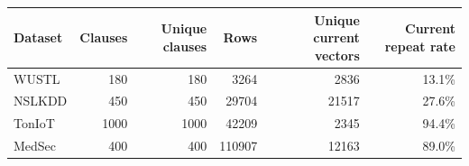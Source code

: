 \begin{tabular}{lrrrrr}
\toprule
Dataset & Clauses & Unique clauses & Rows & Unique current vectors & Current repeat rate \\
\midrule
WUSTL & 180 & 180 & 3264 & 2836 & 13.1\% \\
NSLKDD & 450 & 450 & 29704 & 21517 & 27.6\% \\
TonIoT & 1000 & 1000 & 42209 & 2345 & 94.4\% \\
MedSec & 400 & 400 & 110907 & 12163 & 89.0\% \\
\bottomrule
\end{tabular}

